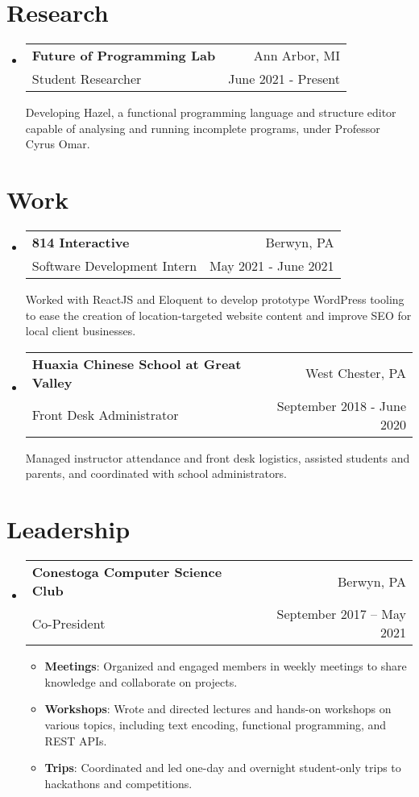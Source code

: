 \documentclass[letterpaper,11pt]{article}
\makeatletter
\newcommand{\resumeSubheading}[4]{
  \vspace{-2pt}\item
    \begin{tabular*}{0.97\textwidth}[t]{l@{\extracolsep{\fill}}r}
      \textbf{#1} & #2 \\
      {#3} & {\small #4} \\[3pt]
    \end{tabular*}\vspace{-5pt}
}
\newcommand{\resumeSubheadingDescription}[1]{
  \parbox{0.97\textwidth}{#1}
}
\newenvironment{resumeSubHeadingList}{
  \begin{itemize}[leftmargin=*, label={}]
}{
  \end{itemize}
}
\newenvironment{resumeItemList}{
  \vspace{-2pt}
  \begin{itemize}
}{
  \end{itemize}
  \vspace{-5pt}
}
\newcommand{\resumeItem}[2]{\item\small{\textbf{#1}{: #2 \vspace{-2pt}}}}
\makeatother
\begin{document}
\section{Research}

  \begin{resumeSubHeadingList}
    \resumeSubheading%
      {Future of Programming Lab}%
      {Ann Arbor, MI}%
      {Student Researcher}%
      {June 2021 - Present}

      \resumeSubheadingDescription{
        Developing Hazel, a functional programming language and structure editor capable of
        analysing and running incomplete programs, under Professor Cyrus Omar.
      }
  \end{resumeSubHeadingList}

\section{Work}
  \begin{resumeSubHeadingList}

    \resumeSubheading%
      {814 Interactive}%
      {Berwyn, PA}%
      {Software Development Intern}%
      {May 2021 - June 2021}

      \resumeSubheadingDescription{
        Worked with ReactJS and Eloquent to develop prototype WordPress tooling to ease the creation
        of location-targeted website content and improve SEO for local client businesses.
      }

    \resumeSubheading%
      {Huaxia Chinese School at Great Valley}%
      {West Chester, PA}%
      {Front Desk Administrator}%
      {September 2018 - June 2020}

      \resumeSubheadingDescription{
        Managed instructor attendance and front desk logistics, assisted students and parents, and
        coordinated with school administrators.
      }

  \end{resumeSubHeadingList}

\section{Leadership}
  \begin{resumeSubHeadingList}

    \resumeSubheading%
      {Conestoga Computer Science Club}%
      {Berwyn, PA}%
      {Co-President}%
      {September 2017 -- May 2021}

      \begin{resumeItemList}
        \resumeItem{Meetings}%
          {Organized and engaged members in weekly meetings to share knowledge and collaborate on
            projects.}
        \resumeItem{Workshops}%
          {Wrote and directed lectures and hands-on workshops on various topics, including text encoding,
            functional programming, and REST APIs.}
        \resumeItem{Trips}%
          {Coordinated and led one-day and overnight student-only trips to hackathons and
            competitions.}
      \end{resumeItemList}

  \end{resumeSubHeadingList}
\end{document}
